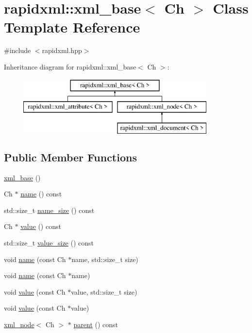 \hypertarget{classrapidxml_1_1xml__base}{}\section{rapidxml\+:\+:xml\+\_\+base$<$ Ch $>$ Class Template Reference}
\label{classrapidxml_1_1xml__base}


{\ttfamily \#include $<$rapidxml.\+hpp$>$}

Inheritance diagram for rapidxml\+:\+:xml\+\_\+base$<$ Ch $>$\+:\begin{figure}[H]
\begin{center}
\leavevmode
\includegraphics[height=3.000000cm]{classrapidxml_1_1xml__base}
\end{center}
\end{figure}
\subsection*{Public Member Functions}
\begin{DoxyCompactItemize}
\item 
\hyperlink{classrapidxml_1_1xml__base_a23e7f7aac02d17a0a01afb597e4b966b}{xml\+\_\+base} ()
\item 
Ch $\ast$ \hyperlink{classrapidxml_1_1xml__base_a9a09739310469995db078ebd0da3ed45}{name} () const 
\item 
std\+::size\+\_\+t \hyperlink{classrapidxml_1_1xml__base_a7e7f98b3d01e1eab8dc1ca69aad9af84}{name\+\_\+size} () const 
\item 
Ch $\ast$ \hyperlink{classrapidxml_1_1xml__base_adcdaccff61c665f039d9344e447b7445}{value} () const 
\item 
std\+::size\+\_\+t \hyperlink{classrapidxml_1_1xml__base_a9fcf201ed0915ac18dd43b0b5dcfaf32}{value\+\_\+size} () const 
\item 
void \hyperlink{classrapidxml_1_1xml__base_ae55060ae958c6e6465d6c8db852ec6ce}{name} (const Ch $\ast$name, std\+::size\+\_\+t size)
\item 
void \hyperlink{classrapidxml_1_1xml__base_a4611ddc82ac83a527c65606600eb2a0d}{name} (const Ch $\ast$name)
\item 
void \hyperlink{classrapidxml_1_1xml__base_a3b183c2db7022a6d30494dd2f0ac11e9}{value} (const Ch $\ast$value, std\+::size\+\_\+t size)
\item 
void \hyperlink{classrapidxml_1_1xml__base_a81e63ec4bfd2d7ef0a6c2ed49be6e623}{value} (const Ch $\ast$value)
\item 
\hyperlink{classrapidxml_1_1xml__node}{xml\+\_\+node}$<$ Ch $>$ $\ast$ \hyperlink{classrapidxml_1_1xml__base_a7f31ae930f93852830234db1ae59c4c4}{parent} () const 
\end{DoxyCompactItemize}
